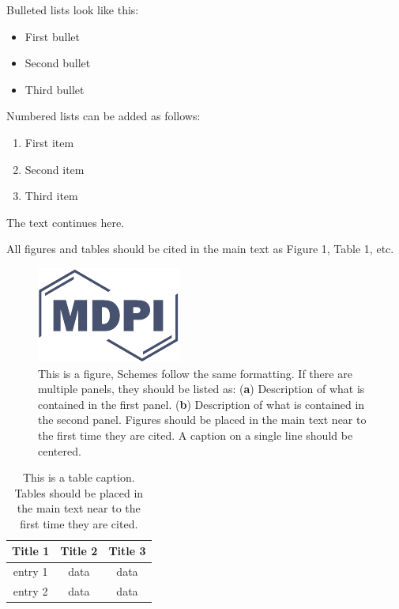 \documentclass[water,article,submit,moreauthors,pdftex]{mdpi}
\providecommand{\tightlist}{%
  \setlength{\itemsep}{0pt}\setlength{\parskip}{0pt}}
\begin{document}
Bulleted lists look like this:

\begin{itemize}
\tightlist
\item
  First bullet
\item
  Second bullet
\item
  Third bullet
\end{itemize}

Numbered lists can be added as follows:

\begin{enumerate}
\def\labelenumi{\arabic{enumi}.}
\tightlist
\item
  First item
\item
  Second item
\item
  Third item
\end{enumerate}

The text continues here.

All figures and tables should be cited in the main text as Figure 1,
Table 1, etc.

\begin{figure}[H]
\centering
\includegraphics[width=3 cm]{logo-mdpi}
\caption{This is a figure, Schemes follow the same formatting. If there are multiple panels, they should be listed as: (\textbf{a}) Description of what is contained in the first panel. (\textbf{b}) Description of what is contained in the second panel. Figures should be placed in the main text near to the first time they are cited. A caption on a single line should be centered.}
\end{figure}

\begin{table}[H]
\caption{This is a table caption. Tables should be placed in the main text near to the first time they are cited.}
\centering
\begin{tabular}{ccc}
\toprule
\textbf{Title 1}    & \textbf{Title 2}  & \textbf{Title 3}\\
\midrule
entry 1     & data          & data\\
entry 2     & data          & data\\
\bottomrule
\end{tabular}
\end{table}
\end{document}
